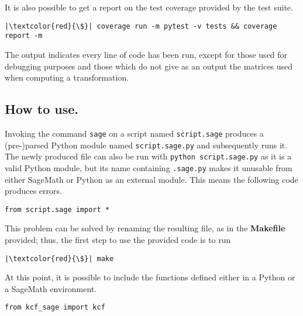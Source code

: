 It is also possible to get a report on the test coverage provided by the test suite.
\begin{verbatim}
|\textcolor{red}{\$}| coverage run -m pytest -v tests && coverage report -m
\end{verbatim}

The output indicates every line of code has been run, except for those used for debugging purposes and those
which do not give as an output the matrices used when computing a transformation.

\subsection*{How to use.}
Invoking the command \texttt{sage} on a script named \texttt{script.sage} produces a (pre-)parsed
Python module named \texttt{script.sage.py} and subsequently runs it. The newly produced file can also
be run with \texttt{python script.sage.py} as it is a valid Python module, but its name containing
\texttt{.sage.py} makes it unusable from either SageMath or Python as an external module. This means the
following code produces errors.
\begin{verbatim}
from script.sage import *
\end{verbatim}

This problem can be solved by renaming the resulting file, as in the \textbf{Makefile} provided; thus, the first step to
use the provided code is to run
\begin{verbatim}
|\textcolor{red}{\$}| make
\end{verbatim}

At this point, it is possible to include the functions defined either in a Python or a SageMath environment.
\begin{verbatim}
from kcf_sage import kcf
\end{verbatim}

